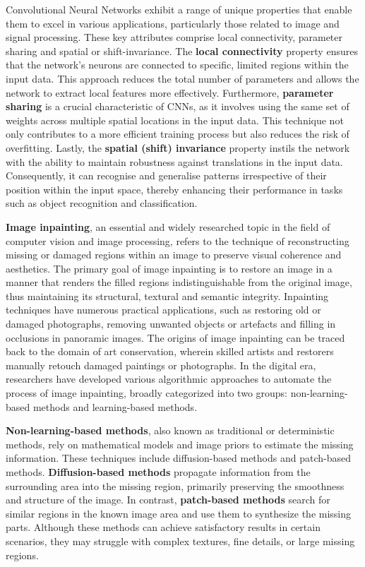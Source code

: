 Convolutional Neural Networks exhibit a range of unique properties that enable them to excel in various applications, particularly those related to image and signal processing. These key attributes comprise local connectivity, parameter sharing and spatial or shift-invariance. The \textbf{local connectivity} property ensures that the network's neurons are connected to specific, limited regions within the input data. This approach reduces the total number of parameters and allows the network to extract local features more effectively. Furthermore, \textbf{parameter sharing} is a crucial characteristic of CNNs, as it involves using the same set of weights across multiple spatial locations in the input data. This technique not only contributes to a more efficient training process but also reduces the risk of overfitting. Lastly, the \textbf{spatial (shift) invariance} property instils the network with the ability to maintain robustness against translations in the input data. Consequently, it can recognise and generalise patterns irrespective of their position within the input space, thereby enhancing their performance in tasks such as object recognition and classification.

\label{section:inpaint}

\textbf{Image inpainting}, an essential and widely researched topic in the field of computer vision and image processing, refers to the technique of reconstructing missing or damaged regions within an image to preserve visual coherence and aesthetics. The primary goal of image inpainting is to restore an image in a manner that renders the filled regions indistinguishable from the original image, thus maintaining its structural, textural and semantic integrity. Inpainting techniques have numerous practical applications, such as restoring old or damaged photographs, removing unwanted objects or artefacts and filling in occlusions in panoramic images. The origins of image inpainting can be traced back to the domain of art conservation, wherein skilled artists and restorers manually retouch damaged paintings or photographs. In the digital era, researchers have developed various algorithmic approaches to automate the process of image inpainting, broadly categorized into two groups: non-learning-based methods and learning-based methods.

\textbf{Non-learning-based methods}, also known as traditional or deterministic methods, rely on mathematical models and image priors to estimate the missing information. These techniques include diffusion-based methods and patch-based methods. \textbf{Diffusion-based methods} propagate information from the surrounding area into the missing region, primarily preserving the smoothness and structure of the image. In contrast, \textbf{patch-based methods} search for similar regions in the known image area and use them to synthesize the missing parts. Although these methods can achieve satisfactory results in certain scenarios, they may struggle with complex textures, fine details, or large missing regions.

